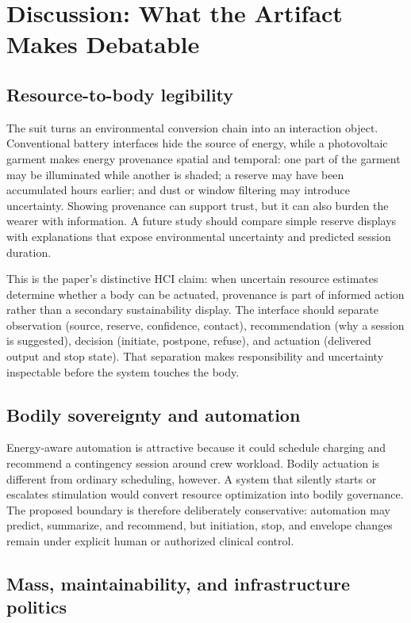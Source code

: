 \documentclass[runningheads]{llncs}
\begin{document}
\section{Discussion: What the Artifact Makes Debatable}

\subsection{Resource-to-body legibility}

The suit turns an environmental conversion chain into an interaction object. Conventional battery interfaces hide the source of energy, while a photovoltaic garment makes energy provenance spatial and temporal: one part of the garment may be illuminated while another is shaded; a reserve may have been accumulated hours earlier; and dust or window filtering may introduce uncertainty. Showing provenance can support trust, but it can also burden the wearer with information. A future study should compare simple reserve displays with explanations that expose environmental uncertainty and predicted session duration.

This is the paper's distinctive HCI claim: when uncertain resource estimates determine whether a body can be actuated, provenance is part of informed action rather than a secondary sustainability display. The interface should separate observation (source, reserve, confidence, contact), recommendation (why a session is suggested), decision (initiate, postpone, refuse), and actuation (delivered output and stop state). That separation makes responsibility and uncertainty inspectable before the system touches the body.

\subsection{Bodily sovereignty and automation}

Energy-aware automation is attractive because it could schedule charging and recommend a contingency session around crew workload. Bodily actuation is different from ordinary scheduling, however. A system that silently starts or escalates stimulation would convert resource optimization into bodily governance. The proposed boundary is therefore deliberately conservative: automation may predict, summarize, and recommend, but initiation, stop, and envelope changes remain under explicit human or authorized clinical control.

\subsection{Mass, maintainability, and infrastructure politics}
\end{document}

